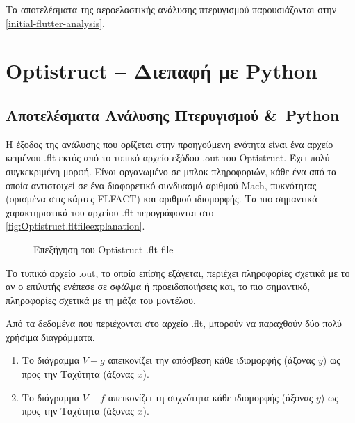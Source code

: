 Τα αποτελέσματα της αεροελαστικής ανάλυσης πτερυγισμού παρουσιάζονται στην \autoref{initial-flutter-analysis}.

\section{\textlatin{Optistruct} -- Διεπαφή με \textlatin{Python}}
\label{optistruct-python-interface}

\subsection{Αποτελέσματα Ανάλυσης Πτερυγισμού \&\ \textlatin{Python} }
\label{results-of-flutter-analysis-python}

Η έξοδος της ανάλυσης που ορίζεται στην προηγούμενη ενότητα είναι ένα αρχείο κειμένου \textlatin{.flt} εκτός από το τυπικό αρχείο εξόδου \textlatin{.out} του \textlatin{Optistruct}. Έχει πολύ συγκεκριμένη μορφή. Είναι οργανωμένο σε μπλοκ πληροφοριών, κάθε ένα από τα οποία αντιστοιχεί σε ένα διαφορετικό συνδυασμό αριθμού \textlatin{Mach}, \textlatin{πυκνότητας} (ορισμένα στις κάρτες \textlatin{FLFACT}) και αριθμού ιδιομορφής. Τα πιο σημαντικά χαρακτηριστικά του αρχείου \textlatin{.flt} περογράφονται στο \autoref{fig:Optistruct.fltfileexplanation}.


\begin{figure}[H]
    \centering
    
    \caption{Επεξήγηση του \textlatin{Optistruct .flt file}}
    \label{fig:Optistruct.fltfileexplanation}
\end{figure}

Το τυπικό αρχείο \textlatin{.out}, το οποίο επίσης εξάγεται, περιέχει πληροφορίες σχετικά με το αν ο επιλυτής ενέπεσε σε σφάλμα ή προειδοποιήσεις και, το πιο σημαντικό, πληροφορίες σχετικά με τη μάζα του μοντέλου.

Από τα δεδομένα που περιέχονται στο αρχείο \textlatin{.flt}, μπορούν να παραχθούν δύο πολύ χρήσιμα διαγράμματα. 


\begin{enumerate}
  \def\labelenumi{\arabic{enumi}.}
  \item
    Το διάγραμμα $V-g$ απεικονίζει την απόσβεση κάθε ιδιομορφής (άξονας $y$) ως προς την Ταχύτητα (άξονας $x$).
  \item
    Το διάγραμμα $V-f$ απεικονίζει τη συχνότητα κάθε ιδιομορφής (άξονας $y$) ως προς την Ταχύτητα (άξονας $x$).
\end{enumerate}
  
